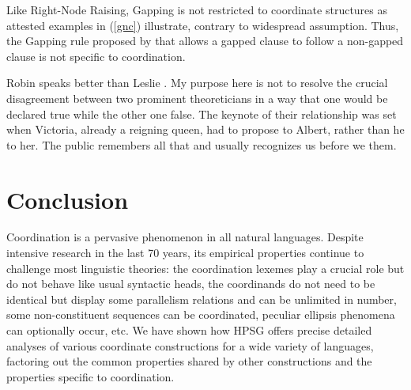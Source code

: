\begin{figure}
    \centering
{}
\end{figure}


Like Right-Node Raising, Gapping is not restricted to coordinate structures as  attested 
examples in (\ref{gnc}) illustrate, contrary to widespread assumption.   Thus, the Gapping rule
proposed by \citet[]{sangheepark} that allows a gapped clause to follow a non-gapped clause is not
specific to coordination.

\eal
\label{gnc}
\ex Robin speaks  better than Leslie \trace {}.
\ex My purpose here is not to resolve the crucial disagreement between two prominent theoreticians in a way that one would be declared true while the other one \trace false.
\ex The keynote of their relationship was set when Victoria, already a reigning queen,
had to propose to Albert, rather than he \trace to her.
\ex The public remembers all that and usually recognizes us before we \trace them.
\zl




\section{Conclusion}

Coordination is a pervasive phenomenon in all natural languages. Despite intensive research in the last 70 years, its empirical properties continue to challenge most linguistic theories:  the coordination lexemes play a crucial role but do not behave like usual syntactic heads, the coordinands do not need to be identical but display some parallelism relations and can be unlimited in number, some non-constituent sequences can be coordinated, peculiar ellipsis phenomena can optionally occur,  etc. We have shown how HPSG offers precise detailed analyses of various coordinate constructions for a wide variety of languages, factoring out the common properties shared by other constructions and the properties specific to coordination.

